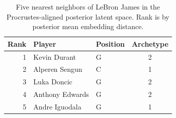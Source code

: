 \begin{table}[htbp]
  \centering\small
  \begin{tabular}{rllc}
    \toprule
    Rank & Player & Position & Archetype \\
    \midrule
    1 & Kevin Durant & G & 2 \\
    2 & Alperen Sengun & C & 1 \\
    3 & Luka Doncic & G & 2 \\
    4 & Anthony Edwards & G & 2 \\
    5 & Andre Iguodala & G & 1 \\
    \bottomrule
  \end{tabular}
  \caption{Five nearest neighbors of LeBron James in the Procrustes-aligned posterior latent space. Rank is by posterior mean embedding distance.}
  \label{tab:LeBron_James_neighbors}
\end{table}

